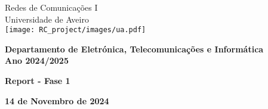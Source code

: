 \documentclass{report}
\begin{document}
%
\def\autores{Fábio Franco, Ricardo Domingues}
\def\empresa{Universidade de Aveiro}
\def\logotipo{ua.pdf}
%
%
\begin{titlepage}
    \centering
    {\LARGE {Redes de Comunicações I}}\\
    \vspace{0.5cm}
    {\LARGE Universidade de Aveiro}\\
    \vspace{1.5cm}
    \texttt{[image: RC\_project/images/ua.pdf]} %
    \vspace{1.5cm}
    
    {\Large \textbf{Departamento de Eletrónica, Telecomunicações e Informática}}\\
    \vspace{0.5cm}
    {\large \textbf{Ano 2024/2025}}\\
    
    \vfill
    
    {\Large \textbf{Report - Fase 1}}\\
    \vspace{0.5cm}
    
    \vfill
    
    \vspace{2cm}
    \begin{center}
      \large \textbf{14 de Novembro de 2024}
    \end{center}
    \vspace{0.1cm}
    \begin{center}
    \end{center}
    
\end{titlepage}



\clearpage
{}
\end{document}
